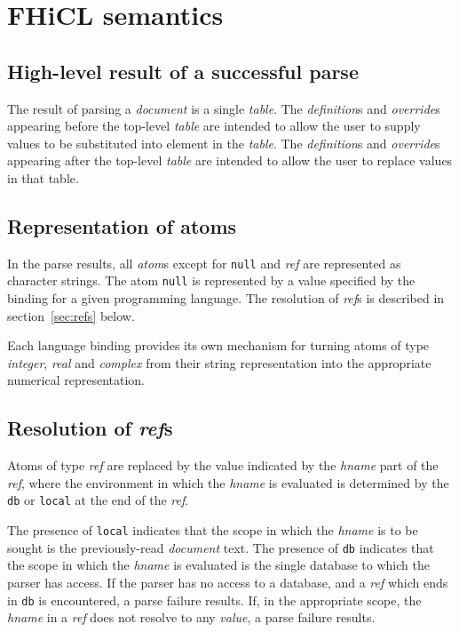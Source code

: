 \documentclass{memarticle}
\begin{document}
\chapter{FHiCL semantics}
\section{High-level result of a successful parse}

The result of parsing a \emph{document}
is a single \emph{table}.
The \emph{definition}s and \emph{override}s
appearing before the top-level \emph{table}
are intended to allow the user
to supply values to be substituted into element in the \emph{table}.
The \emph{definition}s and \emph{override}s
appearing after the top-level \emph{table}
are intended to allow the user
to replace values in that table.

\section{Representation of atoms}
In the parse results,
all \emph{atom}s
except for \texttt{null} and \emph{ref}
are represented
as character strings.
The atom \texttt{null} is represented by a 
value specified by the binding for a given programming language.
The resolution of \emph{ref}s is described in section~\ref{sec:refs} below.

Each language binding
provides its own mechanism
for turning atoms of type \emph{integer}, \emph{real} and \emph{complex}
from their string representation
into the appropriate numerical representation.

\section{Resolution of \emph{ref}s\label{sec:refs}}
Atoms of type \emph{ref} are replaced
by the value indicated by the \emph{hname} part of the \emph{ref},
where the environment in which the \emph{hname} is evaluated is determined
by the \texttt{db} or \texttt{local} at the end of the \emph{ref}.

The presence of \texttt{local} indicates 
that the scope in which the \emph{hname} is to be sought
is the previously-read \emph{document} text.
The presence of \texttt{db} indicates
that the scope in which the \emph{hname} is evaluated
is the single database
to which the parser has access.
If the parser has no access to a database,
and a \emph{ref} which ends in \texttt{db} is encountered,
a parse failure results.
If,
in the appropriate scope,
the \emph{hname} in a \emph{ref} does not resolve to any \emph{value},
a parse failure results.
\end{document}

